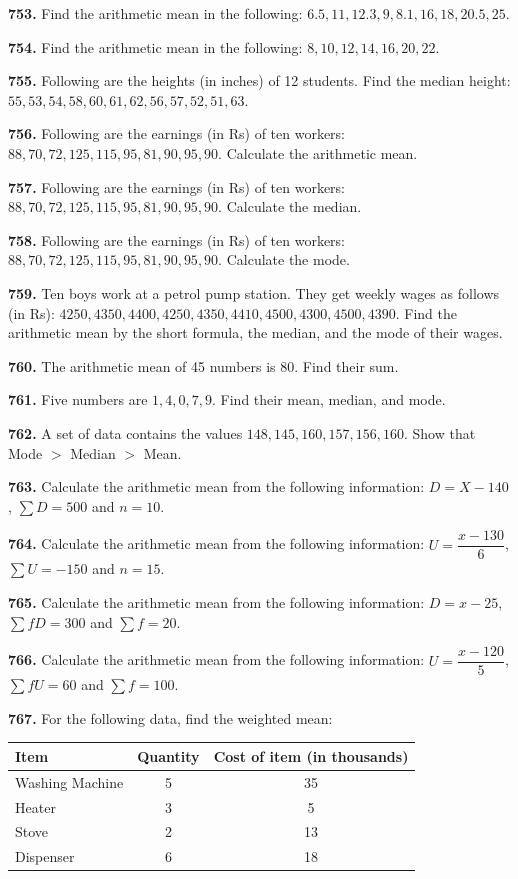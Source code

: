 \documentclass[11pt]{article}
\begin{document}
\bigskip
\noindent\textbf{753.} Find the arithmetic mean in the following: $6.5,11,12.3,9,8.1,16,18,20.5,25$.

\bigskip
\noindent\textbf{754.} Find the arithmetic mean in the following: $8,10,12,14,16,20,22$.

\bigskip
\noindent\textbf{755.} Following are the heights (in inches) of 12 students. Find the median height: $55,53,54,58,60,61,62,56,57,52,51,63$.

\bigskip
\noindent\textbf{756.} Following are the earnings (in Rs) of ten workers: $88,70,72,125,115,95,81,90,95,90$. Calculate the arithmetic mean.

\bigskip
\noindent\textbf{757.} Following are the earnings (in Rs) of ten workers: $88,70,72,125,115,95,81,90,95,90$. Calculate the median.

\bigskip
\noindent\textbf{758.} Following are the earnings (in Rs) of ten workers: $88,70,72,125,115,95,81,90,95,90$. Calculate the mode.

\bigskip
\noindent\textbf{759.} Ten boys work at a petrol pump station. They get weekly wages as follows (in Rs): $4250,4350,4400,4250,4350,4410,4500,4300,4500,4390$. Find the arithmetic mean by the short formula, the median, and the mode of their wages.

\bigskip
\noindent\textbf{760.} The arithmetic mean of 45 numbers is 80. Find their sum.

\bigskip
\noindent\textbf{761.} Five numbers are $1,4,0,7,9$. Find their mean, median, and mode.

\bigskip
\noindent\textbf{762.} A set of data contains the values $148,145,160,157,156,160$. Show that Mode $>$ Median $>$ Mean.

\bigskip
\noindent\textbf{763.} Calculate the arithmetic mean from the following information: $D=X-140$, $\sum D=500$ and $n=10$.

\bigskip
\noindent\textbf{764.} Calculate the arithmetic mean from the following information: $U=\dfrac{x-130}{6}$, $\sum U=-150$ and $n=15$.

\bigskip
\noindent\textbf{765.} Calculate the arithmetic mean from the following information: $D=x-25$, $\sum fD=300$ and $\sum f=20$.

\bigskip
\noindent\textbf{766.} Calculate the arithmetic mean from the following information: $U=\dfrac{x-120}{5}$, $\sum fU=60$ and $\sum f=100$.

\bigskip
\noindent\textbf{767.} For the following data, find the weighted mean:
\begin{center}
\begin{tabular}{lcc}
\toprule
Item & Quantity & Cost of item (in thousands) \\
\midrule
Washing Machine & 5 & 35 \\
Heater & 3 & 5 \\
Stove & 2 & 13 \\
Dispenser & 6 & 18 \\
\bottomrule
\end{tabular}
\end{center}
\end{document}
